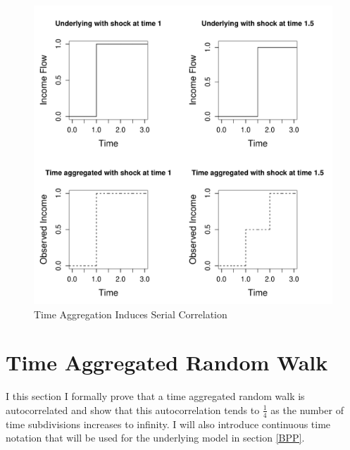 \begin{figure}
	\caption{Time Aggregation Induces Serial Correlation}
	\label{fig:TimeAggExample}
	\includegraphics[width=1\textwidth]{./Chapter1/Figures/TimeAggExample.pdf}
\end{figure}


\section{Time Aggregated Random Walk} \label{TimeAggRandomWalk}
I this section I formally prove that a time aggregated random walk is autocorrelated and show that this autocorrelation tends to $\frac{1}{4}$ as the number of time subdivisions increases to infinity. I will also introduce continuous time notation that will be used for the underlying model in section \ref{BPP}.

